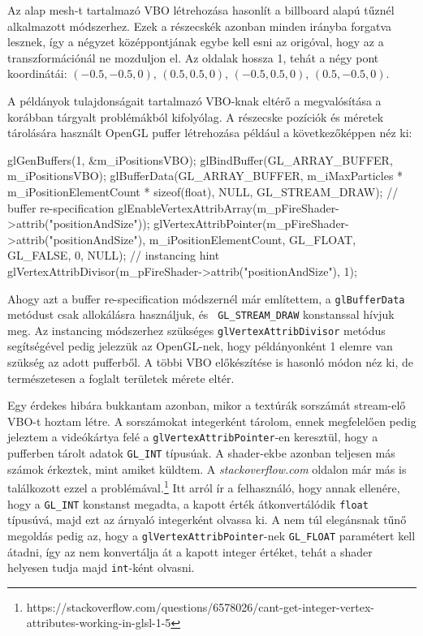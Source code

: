 Az alap mesh-t tartalmazó VBO létrehozása hasonlít a billboard alapú tűznél alkalmazott módszerhez. Ezek a részecskék azonban minden irányba forgatva lesznek, így a négyzet középpontjának egybe kell esni az origóval, hogy az a transzformációnál ne mozduljon el. Az oldalak hossza 1, tehát a négy pont koordinátái: $(-0.5, -0.5, 0)$, $(0.5, 0.5, 0)$, $(-0.5, 0.5, 0)$, $(0.5, -0.5, 0)$.

A példányok tulajdonságait tartalmazó VBO-knak eltérő a megvalósítása a korábban tárgyalt problémákból kifolyólag. A részecske pozíciók és méretek tárolására használt OpenGL puffer létrehozása például a következőképpen néz ki:
\begin{cpp}
glGenBuffers(1, &m_iPositionsVBO);
glBindBuffer(GL_ARRAY_BUFFER, m_iPositionsVBO);
glBufferData(GL_ARRAY_BUFFER, 
	m_iMaxParticles * m_iPositionElementCount * sizeof(float), 
	NULL, GL_STREAM_DRAW); // buffer re-specification
glEnableVertexAttribArray(m_pFireShader->attrib("positionAndSize"));
glVertexAttribPointer(m_pFireShader->attrib("positionAndSize"), 
	m_iPositionElementCount, GL_FLOAT, GL_FALSE, 0, NULL);
// instancing hint
glVertexAttribDivisor(m_pFireShader->attrib("positionAndSize"), 1);
\end{cpp}
Ahogy azt a buffer re-specification módszernél már említettem, a \texttt{glBufferData} metódust csak allokálásra használjuk, és \texttt{ GL\_STREAM\_DRAW} konstanssal hívjuk meg. Az instancing módszerhez szükséges \texttt{glVertexAttribDivisor} metódus segítségével pedig jelezzük az OpenGL-nek, hogy példányonként 1 elemre van szükség az adott pufferből. A többi VBO előkészítése is hasonló módon néz ki, de természetesen a foglalt területek mérete eltér.

Egy érdekes hibára bukkantam azonban, mikor a textúrák sorszámát stream-elő VBO-t hoztam létre. A sorszámokat integerként tárolom, ennek megfelelően pedig jeleztem a videókártya felé a \texttt{glVertexAttribPointer}-en keresztül, hogy a pufferben tárolt adatok \texttt{GL\_INT} típusúak. A shader-ekbe azonban teljesen más számok érkeztek, mint amiket küldtem. A \textit{stackoverflow.com} oldalon már más is találkozott ezzel a problémával.\footnote{https://stackoverflow.com/questions/6578026/cant-get-integer-vertex-attributes-working-in-glsl-1-5} Itt arról ír a felhasználó, hogy annak ellenére, hogy a \texttt{GL\_INT} konstanst megadta, a kapott érték átkonvertálódik \texttt{float} típusúvá, majd ezt az árnyaló integerként olvassa ki. A nem túl elegánsnak tűnő megoldás pedig az, hogy a \texttt{glVertexAttribPointer}-nek  \texttt{GL\_FLOAT} paramétert kell átadni, így az nem konvertálja át a kapott integer értéket, tehát a shader helyesen tudja majd \texttt{int}-ként olvasni.

